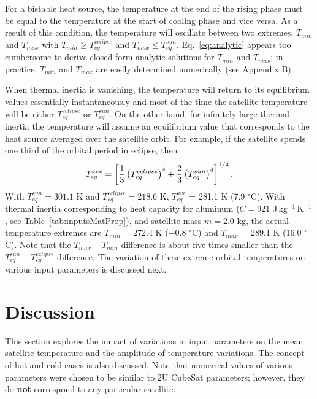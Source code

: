 \documentclass[]{aastex62}
\def\eq#1{\begin{equation} #1 \end{equation}}
\begin{document}
For a bistable heat source, the temperature at the end of the rising phase must be equal to the
temperature at the start of cooling phase and vice versa. As a result of this condition, the 
temperature will oscillate between two extremes, $T_{min}$ and $T_{max}$ with $T_{min} \ge T_{eq}^{eclipse}$ 
and $T_{max} \le T_{eq}^{sun}$.  Eq.~\ref{eq:analytic} appears too cumbersome to derive closed-form
analytic solutions for  $T_{min}$ and $T_{max}$; in practice,  $T_{min}$ and $T_{max}$ are easily determined
numerically (see Appendix B). 

When thermal inertia is vanishing, the temperature will return to its equilibrium values essentially
instantaneously and most of the time the satellite temperature will be either $T_{eq}^{eclipse}$ or $T_{eq}^{sun}$. 
On the other hand, for infinitely large thermal inertia the temperature will assume an equilibrium
value that corresponds to the heat source averaged over the satellite orbit. For example, if the satellite 
spends one third of the orbital period in eclipse, then
\eq{
\label{eq:TeqAve} 
      T_{eq}^{ave} = \left[ {1\over 3} \left(T_{eq}^{eclipse}\right)^4 +  {2\over 3} \left(T_{eq}^{sun}\right)^4 \right]^{1/4}. 
}
With $T_{eq}^{sun} = 301.1$ K and $T_{eq}^{eclipse} = 218.6$ K,  $T_{eq}^{ave}$ = 281.1 K  (7.9 $^\circ$C).  
With thermal inertia corresponding to heat capacity for aluminum ($C=921$ J\,kg$^{-1}$\,K$^{-1}$, see
Table~\ref{tab:inputsMatProp}), and satellite mass $m=2.0$ kg, the actual temperature extremes are $T_{min}$ = 272.4 K 
($-$0.8 $^\circ$C) and $T_{max}$ = 289.1 K  (16.0 $^\circ$C). Note that the $T_{max} - T_{min}$ difference  is about
five times smaller than the $T_{eq}^{sun}  - T_{eq}^{eclipse}$ difference. The variation of these extreme orbital 
temperatures on various input parameters is discussed next. 


\section{Discussion} 

This section explores the impact of variations in input parameters on the mean satellite temperature and the 
amplitude of temperature variations.  The concept of hot and cold cases is also discussed. Note that numerical
values of various parameters were chosen to be similar to 2U CubeSat parameters; however, they do {\bf not}
correspond to any particular satellite. 
\end{document}

